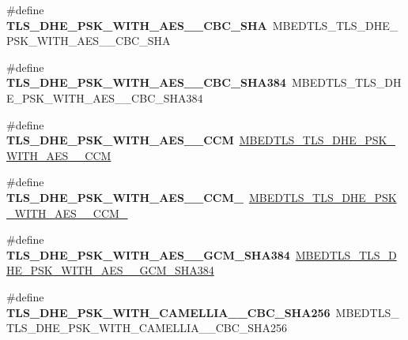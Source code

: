 \begin{DoxyCompactItemize}
\item 
\mbox{\label{compat-1_83_8h_ac8af95f28962ba51d15872e90a6748a5}} 
\#define {\bfseries T\+L\+S\+\_\+\+D\+H\+E\+\_\+\+P\+S\+K\+\_\+\+W\+I\+T\+H\+\_\+\+A\+E\+S\+\_\+\_\+\+C\+B\+C\+\_\+\+S\+HA}~M\+B\+E\+D\+T\+L\+S\+\_\+\+T\+L\+S\+\_\+\+D\+H\+E\+\_\+\+P\+S\+K\+\_\+\+W\+I\+T\+H\+\_\+\+A\+E\+S\+\_\+\_\+\+C\+B\+C\+\_\+\+S\+HA
\item 
\mbox{\label{compat-1_83_8h_a600d77e61a14ab21d494118a604c9aaa}} 
\#define {\bfseries T\+L\+S\+\_\+\+D\+H\+E\+\_\+\+P\+S\+K\+\_\+\+W\+I\+T\+H\+\_\+\+A\+E\+S\+\_\+\_\+\+C\+B\+C\+\_\+\+S\+H\+A384}~M\+B\+E\+D\+T\+L\+S\+\_\+\+T\+L\+S\+\_\+\+D\+H\+E\+\_\+\+P\+S\+K\+\_\+\+W\+I\+T\+H\+\_\+\+A\+E\+S\+\_\+\_\+\+C\+B\+C\+\_\+\+S\+H\+A384
\item 
\mbox{\label{compat-1_83_8h_a16bfd8ab90a52b8fd1ee88e6f088d0c1}} 
\#define {\bfseries T\+L\+S\+\_\+\+D\+H\+E\+\_\+\+P\+S\+K\+\_\+\+W\+I\+T\+H\+\_\+\+A\+E\+S\+\_\+\_\+\+C\+CM}~\mbox{\hyperlink{ssl__ciphersuites_8h_a2141b7b6cde8ab8e3e2cc36e08532383}{M\+B\+E\+D\+T\+L\+S\+\_\+\+T\+L\+S\+\_\+\+D\+H\+E\+\_\+\+P\+S\+K\+\_\+\+W\+I\+T\+H\+\_\+\+A\+E\+S\+\_\+\_\+\+C\+CM}}
\item 
\mbox{\label{compat-1_83_8h_a883070fea785e3127a307018841bdc47}} 
\#define {\bfseries T\+L\+S\+\_\+\+D\+H\+E\+\_\+\+P\+S\+K\+\_\+\+W\+I\+T\+H\+\_\+\+A\+E\+S\+\_\+\_\+\+C\+C\+M\+\_}~\mbox{\hyperlink{ssl__ciphersuites_8h_a8d48af8d31ec02873ae89e2a2a349acd}{M\+B\+E\+D\+T\+L\+S\+\_\+\+T\+L\+S\+\_\+\+D\+H\+E\+\_\+\+P\+S\+K\+\_\+\+W\+I\+T\+H\+\_\+\+A\+E\+S\+\_\+\_\+\+C\+C\+M\+\_}}
\item 
\mbox{\label{compat-1_83_8h_afc2b96f747189bd28f69f02269328a58}} 
\#define {\bfseries T\+L\+S\+\_\+\+D\+H\+E\+\_\+\+P\+S\+K\+\_\+\+W\+I\+T\+H\+\_\+\+A\+E\+S\+\_\+\_\+\+G\+C\+M\+\_\+\+S\+H\+A384}~\mbox{\hyperlink{ssl__ciphersuites_8h_abe30e480a57b6b7c9bfae81503e310d9}{M\+B\+E\+D\+T\+L\+S\+\_\+\+T\+L\+S\+\_\+\+D\+H\+E\+\_\+\+P\+S\+K\+\_\+\+W\+I\+T\+H\+\_\+\+A\+E\+S\+\_\+\_\+\+G\+C\+M\+\_\+\+S\+H\+A384}}
\item 
\mbox{\label{compat-1_83_8h_ab066e663b33dab8a0f129f3d099b9709}} 
\#define {\bfseries T\+L\+S\+\_\+\+D\+H\+E\+\_\+\+P\+S\+K\+\_\+\+W\+I\+T\+H\+\_\+\+C\+A\+M\+E\+L\+L\+I\+A\+\_\+\_\+\+C\+B\+C\+\_\+\+S\+H\+A256}~M\+B\+E\+D\+T\+L\+S\+\_\+\+T\+L\+S\+\_\+\+D\+H\+E\+\_\+\+P\+S\+K\+\_\+\+W\+I\+T\+H\+\_\+\+C\+A\+M\+E\+L\+L\+I\+A\+\_\+\_\+\+C\+B\+C\+\_\+\+S\+H\+A256

\end{DoxyCompactItemize}
